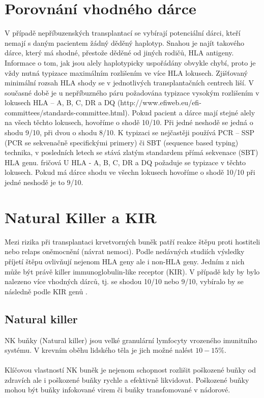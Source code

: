 \documentclass[czech,DP]{thesiskiv}
\begin{document}
\section{Porovnání vhodného dárce}
V případě nepříbuzenských transplantací se vybírají potenciální dárci, kteří nemají s daným
pacientem žádný děděný haplotyp. Snahou je najít takového dárce, který má shodné, přestože
děděné od jiných rodičů, HLA antigeny. Informace o tom, jak jsou alely haplotypicky
uspořádány obvykle chybí, proto je vždy nutná typizace maximálním rozlišením ve více
HLA lokusech. Zjišťovaný minimální rozsah HLA shody se v jednotlivých transplantačních
centrech liší. V současné době je u nepříbuzného páru požadována typizace vysokým
rozlišením v lokusech HLA – A, B, C, DR a DQ (http://www.efiweb.eu/efi-
committees/standards-committee.html). Pokud pacient a dárce mají stejné alely na všech
těchto lokusech, hovoříme o shodě 10/10. Při jedné neshodě se jedná o shodu 9/10, při dvou o
shodu 8/10.
K typizaci se nejčastěji používá PCR – SSP (PCR se sekvenačně specifickými primery) či
SBT (sequence based typing) technika, v posledních letech se stává zlatým standardem přímá
sekvenace (SBT) HLA genu.
fričová
U HLA - A, B, C, DR a DQ požaduje se typizace v těchto lokusech. Pokud má dárce shodu ve všechn lokusech hovoříme o shodě 10/10 při jedné neshodě je to 9/10.
\\

\section{Natural Killer a KIR}
Mezi rizika při transplantaci krvetvorných buněk patří reakce štěpu proti hostiteli nebo relaps oněmocnění (návrat nemoci). Podle nedávných studiích výsledky příjetí štěpu ovlivňují nejenom HLA geny ale i non-HLA geny. Jedním z nich může být právě killer immunoglobulin-like receptor (KIR). V případě kdy by bylo nalezeno více vhodných dárců, tj. se shodou 10/10 nebo 9/10, vybíralo by se následně podle KIR genů \cite{KIR_transplantace_jindra} \cite{Frycova_bakalarka}.

\subsection{Natural killer}
NK buňky (Natural killer) jsou velké granulární lymfocyty vrozeného imunitního systému. V krevním oběhu lidského těla je jich možné nalést $10-15\%$. 
\\
\\
Klíčovou vlastností NK buněk je nejenom schopnost rozlišit poškozené buňky od zdravích ale i poškozené buňky rychle a efektivně likvidovat. Poškozené buňky mohou být buňky infokované virem či buňky transfomované v nádorové. 
\end{document}
